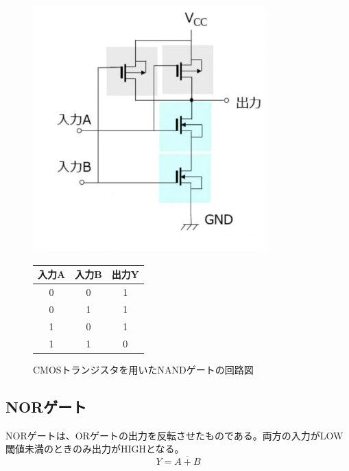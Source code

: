 \documentclass{jlreq}
\numberwithin{equation}{section}
\begin{document}
\begin{figure}[H]
  \centering
  \begin{minipage}{0.45\textwidth}
    \centering
    \includegraphics[width=0.8\textwidth]{assets/nand.png}
    \caption{CMOSトランジスタを用いたNANDゲートの回路図}
    \label{fig:nand_gate}
  \end{minipage}
  \hfill
  \begin{minipage}{0.45\textwidth}
    \centering
    \label{tab:nand_truth_table}
    \begin{tabular}{|c|c|c|}
      \hline
      入力A & 入力B & 出力Y \\ \hline
      0     & 0     & 1     \\ \hline
      0     & 1     & 1     \\ \hline
      1     & 0     & 1     \\ \hline
      1     & 1     & 0     \\ \hline
    \end{tabular}
  \end{minipage}
\end{figure}

\subsection{NORゲート}
NORゲートは、ORゲートの出力を反転させたものである。両方の入力がLOW閾値未満のときのみ出力がHIGHとなる。
\begin{equation}
  Y = \overline{A + B} 
\end{equation}
\end{document}
